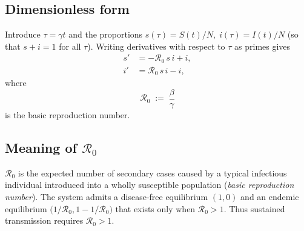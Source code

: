 \documentclass[11pt]{article}
\newcommand{\RR}{\mathcal{R}_0}
\begin{document}
\subsection*{Dimensionless form}
Introduce \(\tau = \gamma t\) and the proportions
\(s(\tau) = S(t)/N,\; i(\tau) = I(t)/N\) (so that \(s+i = 1\) for all \(\tau\)).
Writing derivatives with respect to \(\tau\) as primes gives
\begin{subequations}\label{eq:Dimless-SIS} 
\begin{align}
s' &= -\RR\,s\,i + i, \\ 
i' &=  \RR\,s\,i - i, 
\end{align}
\end{subequations}
where
\begin{equation*}
\RR \;:=\; \frac{\beta}{\gamma}
\end{equation*}
is the basic reproduction number.
\subsection*{Meaning of \(\RR\)}
\(\RR\) is the expected number of secondary cases caused by a typical infectious
individual introduced into a wholly susceptible population (\emph{basic reproduction number}). The system admits a disease‑free equilibrium $(1,0)$ and an endemic equilibrium $\bigl(1/\RR,1-1/\RR\bigr)$ that exists only when $\RR>1$.  Thus sustained transmission requires $\RR>1$.
\end{document}
